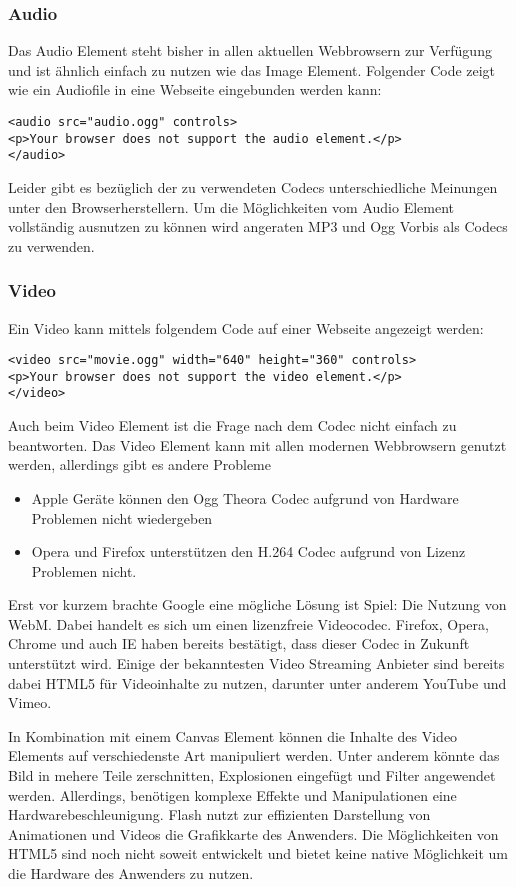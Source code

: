 \subsubsection{Audio}
Das Audio Element steht bisher in allen aktuellen Webbrowsern zur Verfügung und
ist ähnlich einfach zu nutzen wie das Image Element. Folgender Code zeigt wie
ein Audiofile in eine Webseite eingebunden werden kann:
\begin{verbatim}
<audio src="audio.ogg" controls>
<p>Your browser does not support the audio element.</p>
</audio>
\end{verbatim}
Leider gibt es bezüglich der zu verwendeten Codecs unterschiedliche Meinungen
unter den Browserherstellern. Um die Möglichkeiten vom Audio Element vollständig
ausnutzen zu können wird angeraten MP3 und Ogg Vorbis als Codecs zu verwenden.

\subsubsection{Video}
Ein Video kann mittels folgendem Code auf einer Webseite angezeigt werden:
\begin{verbatim}
<video src="movie.ogg" width="640" height="360" controls>
<p>Your browser does not support the video element.</p>
</video>
\end{verbatim}
Auch beim Video Element ist die Frage nach dem Codec nicht einfach zu
beantworten. Das Video Element kann mit allen modernen Webbrowsern genutzt
werden, allerdings gibt es andere Probleme

\begin{itemize}
\item Apple Geräte können den Ogg Theora Codec aufgrund von Hardware Problemen
nicht wiedergeben
\item Opera und Firefox unterstützen den H.264 Codec aufgrund von Lizenz
Problemen nicht.
\end{itemize}

Erst vor kurzem brachte Google eine mögliche Lösung ist Spiel: Die Nutzung von
WebM. Dabei handelt es sich um einen lizenzfreie Videocodec. Firefox, Opera,
Chrome und auch IE haben bereits bestätigt, dass dieser Codec in Zukunft
unterstützt wird.
Einige der bekanntesten Video Streaming Anbieter sind bereits dabei HTML5 für
Videoinhalte zu nutzen, darunter unter anderem YouTube und Vimeo.

In Kombination mit einem Canvas Element können die Inhalte des Video Elements
auf verschiedenste Art manipuliert werden. Unter anderem könnte das Bild in
mehere Teile zerschnitten, Explosionen eingefügt und Filter angewendet werden.
Allerdings, benötigen komplexe Effekte und Manipulationen eine
Hardwarebeschleunigung. Flash nutzt zur effizienten Darstellung von Animationen
und Videos die Grafikkarte des Anwenders. Die Möglichkeiten von HTML5 sind noch
nicht soweit entwickelt und bietet keine native Möglichkeit um die Hardware des
Anwenders zu nutzen.


